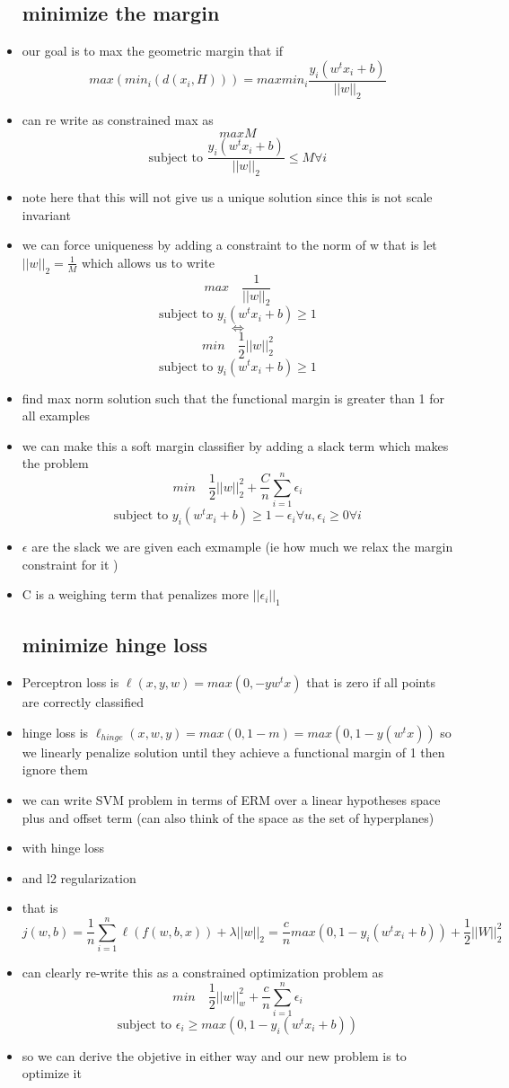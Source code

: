 \documentclass{article}
\begin{document}
\begin{itemize}
\subsection*{minimize the margin}
\item  our goal is to max the geometric margin that if $$max(min_i(d(x_i,H)))=max min_{i}\frac{y_i(w^tx_i+b)}{||w||_{2}}$$
\item can re write as constrained max  as $$max M$$ $$\text{subject to }\frac{y_i(w^tx_i+b)}{||w||_{2}}\leq M \forall i$$
\item note here that this will not give us a unique solution since this is not scale invariant
\item   we can force uniqueness by adding a constraint to the norm of w that is let $||w||_{2}=\frac{1}{M}$ which allows us to write $$max \quad \frac{1}{||w||_{2}}$$ $$\text{subject to } y_i(w^tx_i+b)\geq 1  $$ $$\iff$$ $$min \quad \frac{1}{2}||w||_{2}^2$$ $$\text{subject to } y_i(w^tx_i+b)\geq 1  $$
\item find max norm solution such that the functional margin is greater than 1 for all examples
\item we can make this a soft margin classifier by adding a slack term which makes the problem $$min \quad \frac{1}{2}||w||^2_{2}+\frac{C}{n}\sum_{i=1}^{n}\epsilon_{i}$$ $$\text{subject to } y_i(w^tx_i+b)\geq 1-\epsilon_i \forall u, \epsilon_i\geq 0 \forall i$$
\item $\epsilon $ are the slack we are given each exmample (ie how much we relax the margin constraint for it )
\item C is a weighing term that penalizes more $||\epsilon_i||_{1}$
\subsection*{minimize hinge loss}
\item Perceptron loss is $\ell(x,y,w)=max(0,-yw^tx)$ that is zero if all points are correctly classified
\item hinge loss is $\ell_{hinge}(x,w,y)=max(0,1-m)=max(0,1-y(w^tx))$ so we linearly penalize solution until they achieve a functional margin of 1 then ignore them 
\item we can write SVM problem in terms of ERM over a linear hypotheses space plus and offset term (can also think of the space as the set of hyperplanes)
\item with hinge loss 
\item and l2 regularization 
\item that is $$j(w,b)=\frac{1}{n}\sum_{i=1}^{n}\ell(f(w,b,x))+\lambda||w||_{2}=\frac{c}{n}max(0,1-y_i(w^tx_i+b))+\frac{1}{2}||W||^2_{2} $$
\item can clearly re-write this as a constrained optimization problem as $$min\quad \frac{1}{2}||w||^{2}_{w}+\frac{c}{n}\sum_{i=1}^{n}\epsilon_{i}$$ $$\text{subject to } \epsilon_{i}\geq max(0,1-y_i(w^tx_i+b))$$
\item so we can derive the objetive in either way and our new problem is to optimize it 

\end{itemize}
\end{document}
